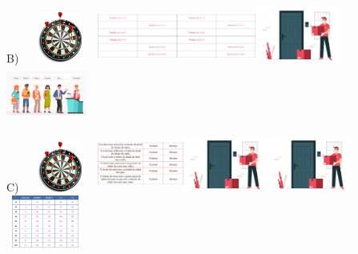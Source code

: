 B)
\includegraphics[width=0.98131in,height=0.65625in]{media/image108.png}\includegraphics[width=1.02736in,height=0.68704in]{media/image110.png}\includegraphics[width=1.02736in,height=0.68704in]{media/image110.png}\includegraphics[width=1.09268in,height=0.73073in]{media/image112.png}\includegraphics[width=1.04264in,height=0.69727in]{media/image113.png}

C)
\includegraphics[width=0.98131in,height=0.65625in]{media/image108.png}\includegraphics[width=1.10972in,height=0.74212in]{media/image109.png}\includegraphics[width=1.09268in,height=0.73073in]{media/image112.png}\includegraphics[width=1.09268in,height=0.73073in]{media/image112.png}\includegraphics[width=1.01042in,height=0.67572in]{media/image111.png}

